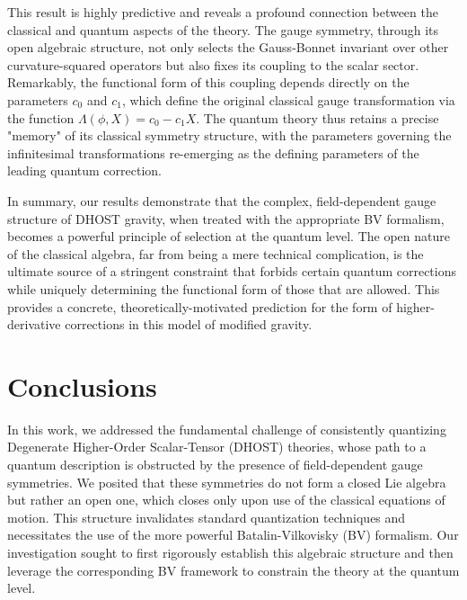 \documentclass[twocolumn]{aastex631}
\begin{document}
This result is highly predictive and reveals a profound connection between the classical and quantum aspects of the theory. The gauge symmetry, through its open algebraic structure, not only selects the Gauss-Bonnet invariant over other curvature-squared operators but also fixes its coupling to the scalar sector. Remarkably, the functional form of this coupling depends directly on the parameters $c_0$ and $c_1$, which define the original classical gauge transformation via the function $\Lambda(\phi, X) = c_0 - c_1 X$. The quantum theory thus retains a precise "memory" of its classical symmetry structure, with the parameters governing the infinitesimal transformations re-emerging as the defining parameters of the leading quantum correction.

In summary, our results demonstrate that the complex, field-dependent gauge structure of DHOST gravity, when treated with the appropriate BV formalism, becomes a powerful principle of selection at the quantum level. The open nature of the classical algebra, far from being a mere technical complication, is the ultimate source of a stringent constraint that forbids certain quantum corrections while uniquely determining the functional form of those that are allowed. This provides a concrete, theoretically-motivated prediction for the form of higher-derivative corrections in this model of modified gravity.

\section{Conclusions}
\label{sec:conclusions}
In this work, we addressed the fundamental challenge of consistently quantizing Degenerate Higher-Order Scalar-Tensor (DHOST) theories, whose path to a quantum description is obstructed by the presence of field-dependent gauge symmetries. We posited that these symmetries do not form a closed Lie algebra but rather an open one, which closes only upon use of the classical equations of motion. This structure invalidates standard quantization techniques and necessitates the use of the more powerful Batalin-Vilkovisky (BV) formalism. Our investigation sought to first rigorously establish this algebraic structure and then leverage the corresponding BV framework to constrain the theory at the quantum level.
\end{document}
